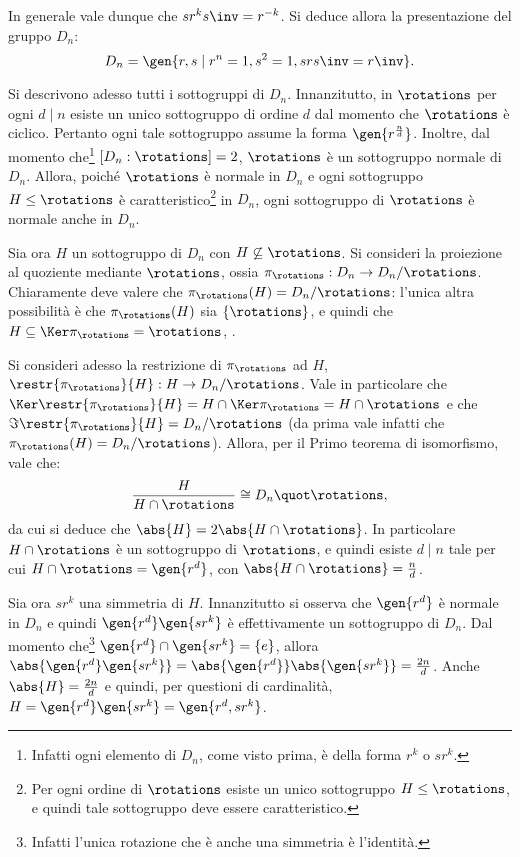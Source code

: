 \documentclass[12pt]{scrartcl}
\begin{document}
	
	In generale vale dunque che $s r^k s\inv = r^{-k}$. Si deduce allora la presentazione del gruppo $D_n$:
	\[ D_n = \gen{r,s \mid r^n = 1, s^2 = 1, s r s\inv = r\inv}. \] \smallskip
	
	
	Si descrivono adesso tutti i sottogruppi di $D_n$. Innanzitutto, in $\rotations$
	per ogni $d \mid n$ esiste un unico sottogruppo di ordine $d$ dal momento che
	$\rotations$ è ciclico. Pertanto ogni tale sottogruppo assume la forma
	$\gen{r^{\frac{n}{d}}}$. Inoltre, dal momento che\footnote{
		Infatti ogni elemento di $D_n$, come visto prima, è della forma $r^k$ o $s r^k$.
	} $[D_n : \rotations] = 2$, $\rotations$ è un sottogruppo normale di
	$D_n$. Allora, poiché $\rotations$ è normale in $D_n$ e ogni sottogruppo
	$H \leq \rotations$ è caratteristico\footnote{
		Per ogni ordine di $\rotations$ esiste un unico sottogruppo $H \leq \rotations$,
		e quindi tale sottogruppo deve essere caratteristico.
	} in $D_n$, ogni sottogruppo di $\rotations$ è normale anche in $D_n$. \medskip
	
	
	Sia ora $H$ un sottogruppo di $D_n$ con $H \not\subseteq \rotations$. Si consideri
	la proiezione al quoziente mediante $\rotations$, ossia $\pi_\rotations : D_n \to D_n /
	\rotations$. Chiaramente deve valere che $\pi_\rotations(H) = D_n / \rotations$: l'unica
	altra possibilità è che $\pi_\rotations(H)$ sia $\{\rotations\}$, e quindi che
	$H \subseteq \Ker \pi_\rotations = \rotations$, \Lightning. \medskip
	
	
	Si consideri adesso
	la restrizione di $\pi_\rotations$ ad $H$, $\restr{\pi_\rotations}{H} : H \to D_n / \rotations$. Vale in particolare che $\Ker \restr{\pi_\rotations}{H} = H \cap \Ker \pi_\rotations = H \cap \rotations$ e che $\Im \restr{\pi_\rotations}{H} = D_n / \rotations$
	(da prima vale infatti che $\pi_\rotations(H) = D_n / \rotations$). Allora, per il Primo
	teorema di isomorfismo, vale che:
	\[ \frac{H}{H \cap \rotations} \cong D_n \quot \rotations, \]
	da cui si deduce che $\abs{H} = 2 \abs{H \cap \rotations}$. In particolare $H \cap \rotations$ è un sottogruppo di $\rotations$, e quindi esiste $d \mid n$ tale per cui
	$H \cap \rotations = \gen{r^d}$, con $\abs{H \cap \rotations} = \frac{n}{d}$. \medskip
	
	
	Sia ora $s r^k$ una simmetria di $H$.
	Innanzitutto si osserva che $\gen{r^d}$ è normale in $D_n$ e quindi
	$\gen{ r^d }\gen{ s r^k }$ è effettivamente un sottogruppo di $D_n$. Dal momento che\footnote{
		Infatti l'unica rotazione che è anche una simmetria è l'identità.
	}
	$\gen{ r^d } \cap \gen{ s r^k } = \{ e \}$, allora $\abs{\gen{ r^d } \gen{ s r^k }} = \abs{\gen{r^d}} \abs{\gen{s r^k}} = \frac{2n}{d}$. Anche $\abs{H} = \frac{2n}{d}$ e
	quindi, per questioni di cardinalità, $H = \gen{ r^d } \gen{ s r^k } = \gen{ r^d, s r^k }$.
	\medskip
	
\end{document}
